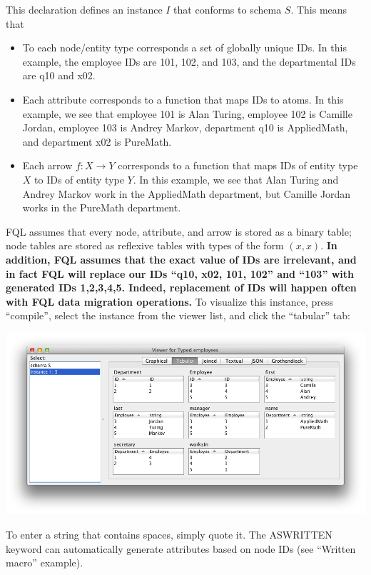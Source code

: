 \documentclass[12pt]{article}
\begin{document}
This declaration defines an instance $I$ that conforms to schema $S$.  This means that
\begin{itemize}
\item To each node/entity type corresponds a set of globally unique IDs.  In this example, the employee IDs are 101, 102, and 103, and the departmental IDs are q10 and x02.
\item Each attribute corresponds to a function that maps IDs to atoms.  In this example, we see that employee 101 is Alan Turing, employee 102 is Camille Jordan, employee 103 is Andrey Markov,  department q10 is AppliedMath, and department x02 is PureMath.
\item Each arrow $f : X \to Y$ corresponds to a function that maps IDs of entity type $X$ to IDs of entity type $Y$.  In this example, we see that Alan Turing and Andrey Markov work in the AppliedMath department, but Camille Jordan works in the PureMath department.
\end{itemize}

FQL assumes that every node, attribute, and arrow is stored as a binary table; node tables are stored as reflexive tables with types of the form $(x,x)$.  {\bf In addition, FQL assumes that the exact value of IDs are irrelevant, and in fact FQL will replace our IDs ``q10, x02, 101, 102'' and ``103''  with generated IDs 1,2,3,4,5.  Indeed, replacement of IDs will happen often with FQL data migration operations.} To visualize this instance, press ``compile'', select the instance from the viewer list, and click the ``tabular'' tab:

\begin{center}
\includegraphics[width=5.5in]{instance}
\end{center}

To enter a string that contains spaces, simply quote it.  The ASWRITTEN keyword can automatically generate attributes based on node IDs (see ``Written macro'' example).
\end{document}
